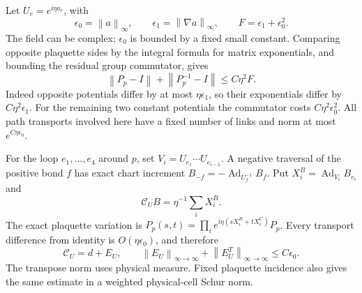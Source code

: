 \documentclass[11pt]{article}
\theoremstyle{remark}
\newcommand{\norm}[1]{\left\|#1\right\|}
\begin{document}
Let $U_e=e^{i\eta a_e}$, with
\begin{equation}\label{nw-sizes}
 \epsilon_0=\norm{a}_\infty,\qquad
 \epsilon_1=\norm{\nabla a}_\infty,\qquad
 F=\epsilon_1+\epsilon_0^2.
\end{equation}
The field can be complex; $\epsilon_0$ is bounded by a fixed small
constant. Comparing opposite plaquette sides by the integral formula
for matrix exponentials, and bounding the residual group commutator,
gives
\begin{equation}\label{nw-plaquette}
 \norm{P_p-I}+\norm{P_p^{-1}-I}\le C\eta^2F.
\end{equation}
Indeed opposite potentials differ by at most $\eta\epsilon_1$,
so their exponentials differ by $C\eta^2\epsilon_1$.
For the remaining two constant potentials the commutator costs
$C\eta^2\epsilon_0^2$. All path transports involved here have a
fixed number of links and norm at most $e^{C\eta\epsilon_0}$.

For the loop $e_1,\ldots,e_4$ around $p$, set
$V_i=U_{e_1}\cdots U_{e_{i-1}}$.
A negative traversal of the positive bond $f$ has exact chart
increment $B_{-f}=-\operatorname{Ad}_{U_f^{-1}}B_f$.
Put $X_i^B=\operatorname{Ad}_{V_i}B_{e_i}$ and
\begin{equation}\label{nw-curl}
 \mathcal C_U B=\eta^{-1}\sum_iX_i^B.
\end{equation}
The exact plaquette variation is
$P_p(s,t)=\prod_i e^{i\eta(sX_i^B+tX_i^C)}P_p$.
Every transport difference from identity is $O(\eta\epsilon_0)$,
and therefore
\begin{equation}\label{nw-curl-difference}
 \mathcal C_U=d+E_U,\qquad
 \norm{E_U}_{\infty\to\infty}
       +\norm{E_U^T}_{\infty\to\infty}\le C\epsilon_0.
\end{equation}
The transpose norm uses physical measure. Fixed plaquette incidence
also gives the same estimate in a weighted physical-cell Schur norm.
\end{document}
